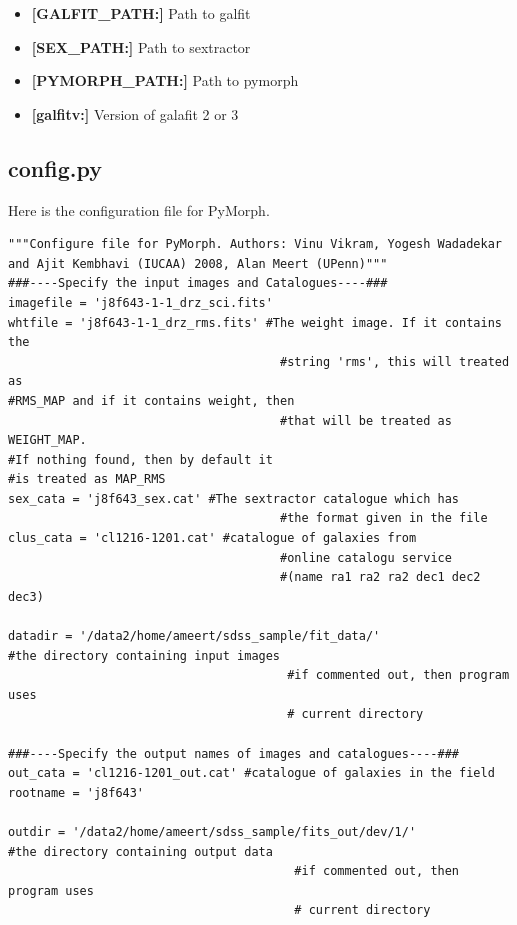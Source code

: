 \documentclass[a4paper,10pt]{article}
\newcommand{\red}[1]{{\color{red}[#1]}}
\begin{document}
\begin{itemize}
\item \textbf{\red{GALFIT\_PATH:}} Path to galfit
\item \textbf{\red{SEX\_PATH:}} Path to sextractor
\item \textbf{\red{PYMORPH\_PATH:}} Path to pymorph
\item \textbf{\red{galfitv:}} Version of galafit 2 or 3


\end{itemize}
\subsection{config.py}
Here is the configuration file for PyMorph.
\begin{footnotesize}
\begin{verbatim}
"""Configure file for PyMorph. Authors: Vinu Vikram, Yogesh Wadadekar and Ajit Kembhavi (IUCAA) 2008, Alan Meert (UPenn)"""
###----Specify the input images and Catalogues----###
imagefile = 'j8f643-1-1_drz_sci.fits'
whtfile = 'j8f643-1-1_drz_rms.fits' #The weight image. If it contains the
                                      #string 'rms', this will treated as
#RMS_MAP and if it contains weight, then
                                      #that will be treated as WEIGHT_MAP.
#If nothing found, then by default it
#is treated as MAP_RMS
sex_cata = 'j8f643_sex.cat' #The sextractor catalogue which has
                                      #the format given in the file
clus_cata = 'cl1216-1201.cat' #catalogue of galaxies from
                                      #online catalogu service
                                      #(name ra1 ra2 ra2 dec1 dec2 dec3)

datadir = '/data2/home/ameert/sdss_sample/fit_data/'
#the directory containing input images
                                       #if commented out, then program uses
                                       # current directory

###----Specify the output names of images and catalogues----###
out_cata = 'cl1216-1201_out.cat' #catalogue of galaxies in the field
rootname = 'j8f643'

outdir = '/data2/home/ameert/sdss_sample/fits_out/dev/1/'
#the directory containing output data
                                        #if commented out, then program uses
                                        # current directory


\end{verbatim}
\end{footnotesize}
\end{document}
